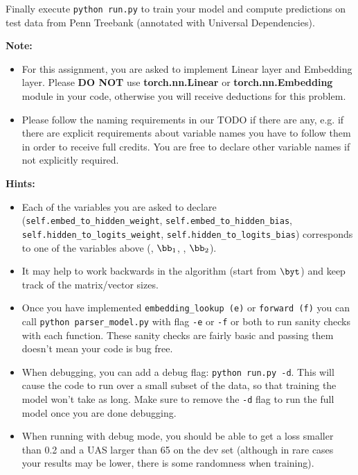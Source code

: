 \begin{parts}
\begin{enumerate}[label=\roman*.]
    Finally execute \texttt{python run.py} to train your model and compute predictions
    on test data from Penn Treebank (annotated with Universal Dependencies). 
    
    \textbf{Note:}
    \begin{itemize}
        \item For this assignment, you are asked to implement Linear layer and Embedding layer. Please \textbf{DO NOT} use \textbf{torch.nn.Linear} or  \textbf{torch.nn.Embedding} module in your code, otherwise you will receive deductions for this problem. 
        \item Please follow the naming requirements in our TODO if there are any, e.g. if there are explicit requirements about variable names you have to follow them in order to receive full credits. You are free to declare other variable names if not explicitly required. 
    \end{itemize}
    
    \textbf{Hints:}
    \begin{itemize}
        \item Each of the variables you are asked to declare (\texttt{self.embed\_to\_hidden\_weight}, \newline \texttt{self.embed\_to\_hidden\_bias}, \texttt{self.hidden\_to\_logits\_weight}, \newline \texttt{self.hidden\_to\_logits\_bias}) corresponds to one of the variables above (\bW, $\bb_1$, \bU, $\bb_2$).  
        \item It may help to work backwards in the algorithm (start from $\byt$) and keep track of the matrix/vector sizes.  
        \item Once you have implemented \texttt{embedding\_lookup (e)} or \texttt{forward (f)} you can call \texttt{python parser\_model.py} with flag \texttt{-e} or \texttt{-f} or both to run sanity checks with each function. These sanity checks are fairly basic and passing them doesn't mean your code is bug free.
        \item
            When debugging, you can add a debug flag: \texttt{python run.py -d}. This will cause the code to run over a small subset of the data, so that training the model won't take as long. Make sure to remove the \texttt{-d} flag to run the full model once you are done debugging.

        \item
            When running with debug mode, you should be able to get a loss smaller than 0.2 and a UAS larger than 65 on the dev set (although in rare cases your results may be lower, there is some randomness when training).
        

\end{itemize}
\end{enumerate}
\end{parts}
